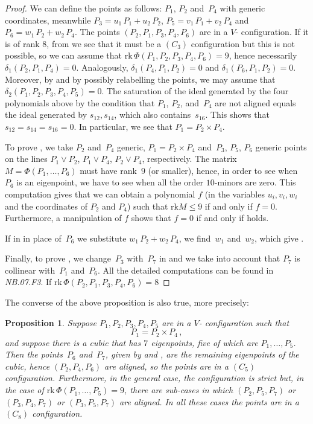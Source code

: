 \documentclass[a4paper, 11pt, reqno]{amsart}
\theoremstyle{plain}
\newtheorem{prop}[lemma]{Proposition}
\theoremstyle{definition}
\newcommand{\nb}[2]{\textsl{{NB}.{#1}.{#2}}}
\newcommand{\rk}{\ensuremath{\mathrm{rk}}}
\begin{document}
\begin{proof}
We can define the points as follows: $P_1$, $P_2$ and~$P_4$ with generic
coordinates, meanwhile $P_3 = u_1 \, P_1 + u_2 \, P_2$, $P_5 = v_1 \, P_1 + v_2 \, P_4$ and
$P_6 = w_1 \, P_2 + w_2 \, P_4$. The points $(P_2, P_1, P_3, P_4, P_6)$ are in a
$V$- configuration. If it is of rank $8$, 
from  we see that it must be 
a $(C_3)$ configuration but this is not possible, so
we can assume that $\rk \, \Phi(P_1, P_2, P_3, P_4, P_6) = 9$, hence necessarily $\delta_1(P_2, P_1, P_4)=0$.
Analogously, $\delta_1(P_4, P_1, P_2) = 0$ and $\delta_1(P_6, P_1, P_2) = 0$. Moreover, by  and by possibly relabelling the points, we may assume that $\delta_2(P_1, P_2, P_3, P_4, P_5)=0$. The saturation of the ideal generated by the four polynomials
above by the condition that $P_1$, $P_2$, and~$P_4$ are not aligned equals the ideal generated by
$s_{12}, s_{14}$, which also contains~$s_{16}$. This shows that
$s_{12} = s_{14}=s_{16}=0$. In particular, we see that $P_1 = P_2 \times P_4$.

To prove , we take $P_2$ and~$P_4$ generic,
$P_1 = P_2 \times P_4$ and~$P_3$, $P_5$, $P_6$ generic points on the lines
$P_1 \vee P_2$, $P_1 \vee P_4$, $P_2 \vee P_4$, respectively. 
The matrix $M = \Phi(P_1, \dots, P_6)$ must have rank~$9$ (or smaller), 
hence, in order to see when $P_6$ is an eigenpoint,
we have to see when all the order $10$-minors are zero. This computation gives that we can obtain a polynomial $f$ (in the 
variables $u_i, v_i, w_i$ and the coordinates of $P_2$ and $P_4$) such that $\rk M \leq 9$ if and only if $f=0$. Furthermore, 
a manipulation of $f$ shows that $f=0$ if and only if  holds.

If in  in place of~$P_6$ we substitute $w_1 \, P_2 + w_2 \, P_4$,
we find~$w_1$ and~$w_2$, which give .

Finally, to prove , we change~$P_3$ with~$P_7$ in  and we take into account that $P_7$ is collinear with~$P_1$ and~$P_6$. All the detailed computations can be found in \nb{07}{F3}.
If $\rk\, \Phi(P_2, P_1, P_3, P_4, P_6) = 8$
\end{proof}
%
The converse of the above proposition is also true, more precisely:
\begin{prop}
   Suppose $P_1, P_2, P_3, P_4, P_5$ are in a $V$- configuration such that
%
\[
  P_1 = P_2 \times P_4 \,,
\]
%
and suppose there is a cubic that has $7$ eigenpoints, five of which are $P_1, \dotsc, P_5$. Then the points~$P_6$ and~$P_7$, given by  and , are the remaining eigenpoints of the cubic, hence $(P_2, P_4, P_6)$ are aligned, so the points are in a $(C_5)$ configuration. Furthermore, in the general case, the configuration is 
strict but, in the case of $\rk \, \Phi(P_1, \dotsc, P_5) = 9$, there are sub-cases in which $(P_2, P_5, P_7)$ or $(P_3, P_4, P_7)$ or $(P_3, P_5, P_7)$ are aligned. In all these cases the points are in a $(C_8)$ configuration.
\end{prop}
\end{document}
